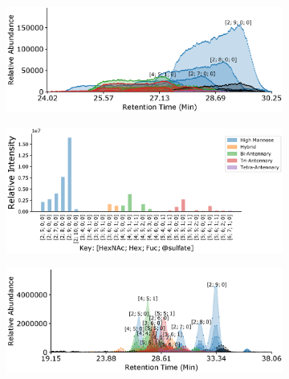     \begin{figure}[tb]
        \centering
        \begin{minipage}{1\linewidth}
            \centering
            \begin{subfigure}[b]{0.49\linewidth}
                \includegraphics[width=1\linewidth, valign=t]{figure/native_phil82_chromatograms.eps}
                \subcaption{
                    \label{fig:phil82_assignment:a}
                }
            \end{subfigure}
            \vspace{0pt}
            \begin{subfigure}[b]{0.49\linewidth}
                \includegraphics[width=1\linewidth, valign=b]{figure/native_phil82_abundances.eps}
                \subcaption{
                    \label{fig:phil82_assignment:b}
                }
            \end{subfigure}
        \end{minipage}
        \begin{minipage}{1\linewidth}
            \centering
            \begin{subfigure}[b]{0.49\linewidth}
                \includegraphics[width=1\linewidth, valign=t]{figure/dp_phil82_chromatograms.eps}

\end{subfigure}
\end{minipage}
\end{figure}
